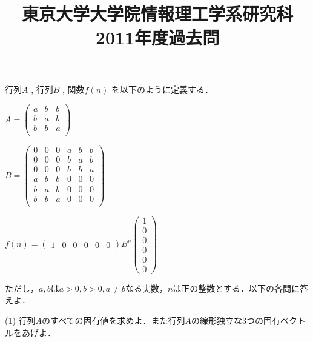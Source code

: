 \documentclass[a4j]{jarticle}
\title{東京大学大学院情報理工学系研究科2011年度過去問}
\author{}
\date{}
\let \ds \displaystyle
\begin{document}
\thispagestyle{empty}
\maketitle
\pagebreak

\section{}

\begin{screen}
 行列$A$ , 行列$B$ , 関数$f(n)$ を以下のように定義する．
 
 $\ds A=\begin{pmatrix}
         a & b & b \\
         b & a & b \\
         b & b & a \\
        \end{pmatrix}$

 $\ds B=\begin{pmatrix}
         0&0&0&a&b&b\\
         0&0&0&b&a&b\\
         0&0&0&b&b&a\\         
         a&b&b&0&0&0\\
         b&a&b&0&0&0\\
         b&b&a&0&0&0\\         
        \end{pmatrix}$
 
 $\ds f(n)=\begin{pmatrix} 1&0&0&0&0&0 \end{pmatrix}B^n
 \left(\begin{array}{c}1\\0\\0\\0\\0\\0\end{array}\right)$

 ただし，$a,b$は$a>0,b>0,a \neq b$なる実数，$n$は正の整数とする．以下の各問に答えよ．
\end{screen}

\begin{screen}
 (1) 行列$A$のすべての固有値を求めよ．また行列$A$の線形独立な3つの固有ベクトルをあげよ．
\end{screen}
\end{document}
